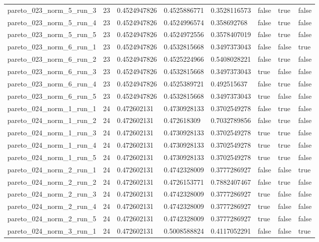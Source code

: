 \begin{tabular}{@{}llllllll@{}}
pareto\_023\_norm\_5\_run\_3 & 23 & 0.4524947826 & 0.4525886771 & 0.3528116573 & false & true & false \\
pareto\_023\_norm\_5\_run\_4 & 23 & 0.4524947826 & 0.4524996574 & 0.358692768 & false & true & false \\
pareto\_023\_norm\_5\_run\_5 & 23 & 0.4524947826 & 0.4524972556 & 0.3578407019 & false & true & false \\
pareto\_023\_norm\_6\_run\_1 & 23 & 0.4524947826 & 0.4532815668 & 0.3497373043 & false & false & true \\
pareto\_023\_norm\_6\_run\_2 & 23 & 0.4524947826 & 0.4525224966 & 0.5408028221 & false & true & false \\
pareto\_023\_norm\_6\_run\_3 & 23 & 0.4524947826 & 0.4532815668 & 0.3497373043 & true & false & false \\
pareto\_023\_norm\_6\_run\_4 & 23 & 0.4524947826 & 0.4525389721 & 0.492515637 & false & true & false \\
pareto\_023\_norm\_6\_run\_5 & 23 & 0.4524947826 & 0.4532815668 & 0.3497373043 & true & false & false \\
pareto\_024\_norm\_1\_run\_1 & 24 & 0.472602131 & 0.4730928133 & 0.3702549278 & false & true & false \\
pareto\_024\_norm\_1\_run\_2 & 24 & 0.472602131 & 0.472618309 & 0.7032789856 & false & true & false \\
pareto\_024\_norm\_1\_run\_3 & 24 & 0.472602131 & 0.4730928133 & 0.3702549278 & true & true & false \\
pareto\_024\_norm\_1\_run\_4 & 24 & 0.472602131 & 0.4730928133 & 0.3702549278 & true & true & false \\
pareto\_024\_norm\_1\_run\_5 & 24 & 0.472602131 & 0.4730928133 & 0.3702549278 & true & true & false \\
pareto\_024\_norm\_2\_run\_1 & 24 & 0.472602131 & 0.4742328009 & 0.3777286927 & false & false & true \\
pareto\_024\_norm\_2\_run\_2 & 24 & 0.472602131 & 0.4726153771 & 0.7882407467 & false & true & false \\
pareto\_024\_norm\_2\_run\_3 & 24 & 0.472602131 & 0.4742328009 & 0.3777286927 & true & false & false \\
pareto\_024\_norm\_2\_run\_4 & 24 & 0.472602131 & 0.4742328009 & 0.3777286927 & true & false & false \\
pareto\_024\_norm\_2\_run\_5 & 24 & 0.472602131 & 0.4742328009 & 0.3777286927 & true & false & false \\
pareto\_024\_norm\_3\_run\_1 & 24 & 0.472602131 & 0.5008588824 & 0.4117052291 & false & false & true \\

\end{tabular}

